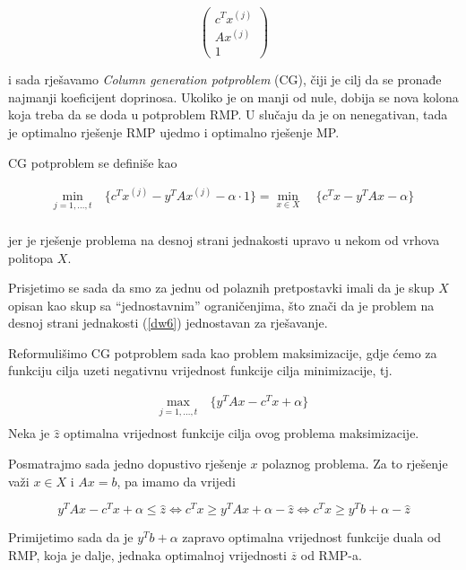 \documentclass[a4paper, utf8, 11pt, colorlinks]{book}
\begin{document}
 $$\left(\begin{array}{c}
 	c^T x^{(j)}\\
 	A x^{(j)} \\
 	1 
 \end{array}\right)$$
 
 i sada rješavamo \emph{Column generation potproblem} (CG), čiji je cilj da se pronađe najmanji koeficijent doprinosa. Ukoliko je on manji od nule, dobija se nova kolona koja treba da se doda u potproblem RMP.  U slučaju da je on nenegativan, tada je optimalno rješenje RMP ujedmo i optimalno rješenje MP.
 
 CG potproblem se definiše kao
 
      \begin{equation}
 	\begin{aligned}\label{dw6}
 		\min_{j=1,\ldots,t}\  & \{c^T x^{(j)} -y^T	Ax^{(j)}-\alpha\cdot 1\}=\min_{x\in X}\  & \{c^Tx-y^T	Ax-\alpha\}\\
 	\end{aligned}
 \end{equation}
 
jer je rješenje problema na desnoj strani jednakosti upravo u nekom od vrhova politopa $X$.

Prisjetimo se sada da smo za jednu od polaznih pretpostavki imali da je skup $X$ opisan kao skup sa ``jednostavnim'' ograničenjima, što znači da je problem na desnoj strani jednakosti (\ref{dw6}) jednostavan za rješavanje.

Reformulišimo  CG potproblem sada kao problem maksimizacije, gdje ćemo za funkciju cilja uzeti negativnu vrijednost funkcije cilja minimizacije, tj.
 
 
       \begin{equation}
 	\begin{aligned}\label{dw7}
 		\max_{j=1,\ldots,t}\  &  \{y^T	Ax-c^Tx+\alpha\}\\
 	\end{aligned}
 \end{equation}
Neka je $\hat{z}$ optimalna vrijednost funkcije cilja ovog problema maksimizacije.

Posmatrajmo sada jedno dopustivo rješenje $x$ polaznog problema. Za to rješenje važi 
$x\in X$ i $Ax=b$, pa imamo da vrijedi %
 
 $$y^T	Ax-c^Tx+\alpha\leqslant \hat{z} \Leftrightarrow c^Tx\geqslant y^T	Ax+\alpha-\hat{z} \Leftrightarrow  c^T x \geqslant y^T b+\alpha-\hat{z}$$
 
 Primijetimo sada da je  $y^T b+\alpha$ zapravo  optimalna vrijednost funkcije duala od RMP, koja je dalje, jednaka optimalnoj vrijednosti $\overline{z}$ od RMP-a. 
 
\end{document}
